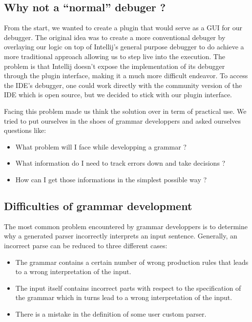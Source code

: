 \subsection{Why not a ``normal'' debuger ?}

From the start, we wanted to create a plugin that would serve as a GUI for our debugger. The original idea was to create a more conventional debuger by overlaying our logic on top of Intellij's general purpose debugger to do achieve a more traditional approach allowing us to step live into the execution. The problem is that Intellij doesn't expose the implementation of its debugger through the plugin interface, making it a much more difficult endeavor. To access the IDE's debugger, one could work directly with the community version of the IDE which is open source, but we decided to stick with our plugin interface.

\bigskip

Facing this problem made us think the solution over in term of practical use. We tried to put ourselves in the shoes of grammar developpers and asked ourselves questions like: 

\begin{itemize}
	\item What problem will I face while developping a grammar ?
	\item What information do I need to track errors down and take decisions ?
	\item How can I get those informations in the simplest possible way ?
\end{itemize}

\subsection{Difficulties of grammar development} 

The most common problem encountered by grammar developpers is to determine why a generated parser incorrectly interprets an input sentence. Generally, an incorrect parse can be reduced to three different cases:

\begin{itemize}
	\item The grammar contains a certain number of wrong production rules that leads to a wrong interpretation of the input.
	\item The input itself contains incorrect parts with respect to the specification of the grammar which in turns lead to a wrong interpretation of the input.
	\item There is a mistake in the definition of some user custom parser.
\end{itemize}

